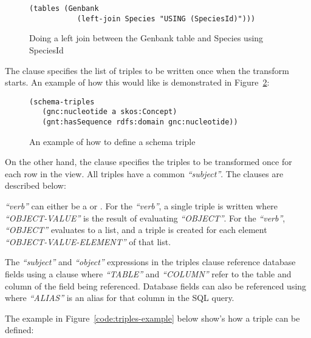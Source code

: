 \begin{figure}[H]
\centering
\begin{verbatim}
(tables (Genbank
           (left-join Species "USING (SpeciesId)")))
\end{verbatim}
\caption{Doing a left join between the Genbank table and Species using SpeciesId}\label{code:genbank-species-join-example}
\end{figure}

The  clause specifies the list of triples to be written once when the transform starts.  An example of how this would like is demonstrated in Figure~\ref{code:schema-triples-example}:

\begin{figure}[H]
\centering
\begin{verbatim}
(schema-triples
   (gnc:nucleotide a skos:Concept)
   (gnt:hasSequence rdfs:domain gnc:nucleotide))
\end{verbatim}
\caption{An example of how to define a schema triple}\label{code:schema-triples-example}
\end{figure}

On the other hand, the  clause specifies the triples to be transformed once for each row in the view.  All triples have a common \textit{``subject''}.  The  clauses are described below:

\textit{``verb''} can either be a  or .  For the  \textit{``verb''}, a single triple  is written where \textit{``OBJECT-VALUE''} is the result of evaluating \textit{``OBJECT''}.  For the  \textit{``verb''}, \textit{``OBJECT''} evaluates to a list, and a triple  is created for each element \textit{``OBJECT-VALUE-ELEMENT''} of that list.

The \textit{``subject''} and \textit{``object''} expressions in the triples clause reference database fields using a  clause where \textit{``TABLE''} and \textit{``COLUMN''} refer to the table and column of the field being referenced.  Database fields can also be referenced using  where \textit{``ALIAS''} is an alias for that column in the SQL query.

The example in Figure~\ref{code:triples-example} below show's how a triple can be defined:

